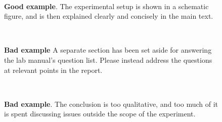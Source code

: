 \documentclass[11pt,a4paper]{article}
\begin{document}
\begin{figure}[h]
  \centering
   \\
  \caption{\small \textbf{Good example}.  The experimental setup is
    shown in a schematic figure, and is then explained clearly and
    concisely in the main text.}
\end{figure}


\begin{figure}
  \centering
   \\
  \caption{\small \textbf{Bad example} A separate section has been set
    aside for answering the lab manual's question list.  Please
    instead address the questions at relevant points in the report.}
\end{figure}

\begin{figure}[h]
  \centering
   \\
  \caption{\small \textbf{Bad example}.  The conclusion is too
    qualitative, and too much of it is spent discussing issues outside
    the scope of the experiment.}
\end{figure}
\end{document}

